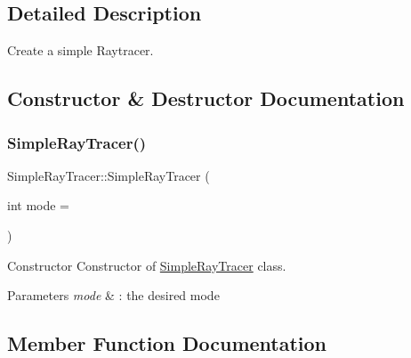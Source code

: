 \subsection{Detailed Description}
Create a simple Raytracer. 

\subsection{Constructor \& Destructor Documentation}
\mbox{\label{classSimpleRayTracer_aec30e74e21fea028c25a37fc5d9278d2}} 
\subsubsection{\texorpdfstring{Simple\+Ray\+Tracer()}{SimpleRayTracer()}}
{\footnotesize\ttfamily Simple\+Ray\+Tracer\+::\+Simple\+Ray\+Tracer (\begin{DoxyParamCaption}\item[{int}]{mode = {} }\end{DoxyParamCaption})\hspace{0.3cm}{\ttfamily [inline]}}



Constructor Constructor of \hyperlink{classSimpleRayTracer}{Simple\+Ray\+Tracer} class. 


\begin{DoxyParams}{Parameters}
{\em mode} & \+: the desired mode \\
\hline
\end{DoxyParams}


\subsection{Member Function Documentation}
\mbox{\label{classSimpleRayTracer_ac47615738da770c6799d018a95e8cffd}} 
